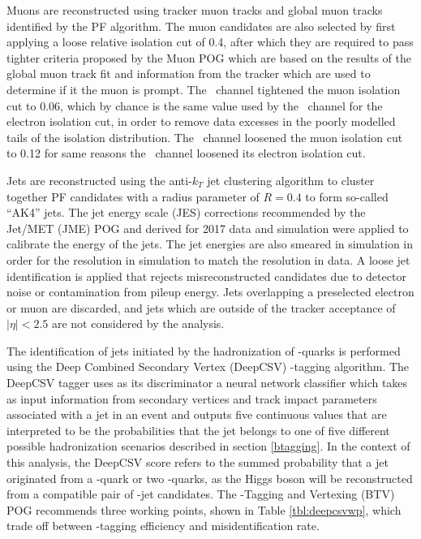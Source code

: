 Muons are reconstructed using tracker muon tracks and global muon tracks identified by the PF algorithm. The muon candidates are also selected by first applying a loose relative isolation cut of 0.4, after which they are required to pass tighter criteria proposed by the Muon POG which are based on the results of the global muon track fit and information from the tracker which are used to determine if it the muon is prompt. The \WmnH\ channel tightened the muon isolation cut to 0.06, which by chance is the same value used by the \WenH\ channel for the electron isolation cut, in order to remove data excesses in the poorly modelled tails of the isolation distribution. The \ZmmH\ channel loosened the muon isolation cut to 0.12 for same reasons the \ZeeH\ channel loosened its electron isolation cut.

Jets are reconstructed using the anti-$k_{T}$ jet clustering algorithm\cite{ANTIKT} to cluster together PF candidates with a radius parameter of $R = 0.4$ to form so-called ``AK4'' jets. The jet energy scale (JES) corrections recommended by the Jet/MET (JME) POG and derived for 2017 data and simulation were applied to calibrate the energy of the jets. The jet energies are also smeared in simulation in order for the resolution in simulation to match the resolution in data. A loose jet identification is applied that rejects misreconstructed candidates due to detector noise or contamination from pileup energy. Jets overlapping a preselected electron or muon are discarded, and jets which are outside of the tracker acceptance of $\left| \eta \right| < 2.5$ are not considered by the analysis.

The identification of jets initiated by the hadronization of \qrkb-quarks is performed using the Deep Combined Secondary Vertex (DeepCSV)\cite{CMSBTAG} \qrkb-tagging algorithm. The DeepCSV tagger uses as its discriminator a neural network classifier which takes as input information from secondary vertices and track impact parameters associated with a jet in an event and outputs five continuous values that are interpreted to be the probabilities that the jet belongs to one of five different possible hadronization scenarios described in section \ref{btagging}. In the context of this analysis, the DeepCSV score refers to the summed probability that a jet originated from a \qrkb-quark or two \qrkb-quarks, as the Higgs boson will be reconstructed from a compatible pair of \qrkb-jet candidates. The \qrkb-Tagging and Vertexing (BTV) POG recommends three working points, shown in Table \ref{tbl:deepcsvwp}, which trade off between \qrkb-tagging efficiency and misidentification rate.

